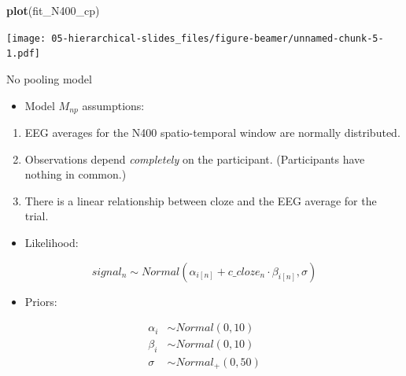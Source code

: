 \documentclass[12pt,ignorenonframetext,aspectratio=169]{beamer}
\newenvironment{Shaded}{\begin{snugshade}}{\end{snugshade}}
\newcommand{\KeywordTok}[1]{\textcolor[rgb]{0.13,0.29,0.53}{\textbf{#1}}}
\newcommand{\NormalTok}[1]{#1}
\providecommand{\tightlist}{%
  \setlength{\itemsep}{0pt}\setlength{\parskip}{0pt}}
\begin{document}
\begin{frame}[fragile]

\small

\begin{Shaded}
\begin{Highlighting}[]
\KeywordTok{plot}\NormalTok{(fit_N400_cp)}
\end{Highlighting}
\end{Shaded}

\texttt{[image: 05-hierarchical-slides\_files/figure-beamer/unnamed-chunk-5-1.pdf]}

\normalsize

\end{frame}

\begin{frame}{No pooling model}
\protect\hypertarget{no-pooling-model}{}

\begin{itemize}
\tightlist
\item
  Model \(M_{np}\) assumptions:
\end{itemize}

\begin{enumerate}
\tightlist
\item
  EEG averages for the N400 spatio-temporal window are normally distributed.
\item
  Observations depend \emph{completely} on the participant. (Participants have nothing in common.)
\item
  There is a linear relationship between cloze and the EEG average for the trial.
\end{enumerate}

\end{frame}

\begin{frame}

\begin{itemize}
\tightlist
\item
  Likelihood:
\end{itemize}

\begin{equation}
 signal_n \sim Normal( \alpha_{i[n]} + c\_cloze_n \cdot \beta_{i[n]},\sigma)
 \end{equation}

\begin{itemize}
\tightlist
\item
  Priors:
\end{itemize}

\begin{equation}
 \begin{aligned}
 \alpha_i &\sim Normal(0,10)\\
 \beta_i  &\sim Normal(0,10)\\
 \sigma  &\sim Normal_+(0,50)
 \end{aligned}
 \end{equation}

\end{frame}
\end{document}

